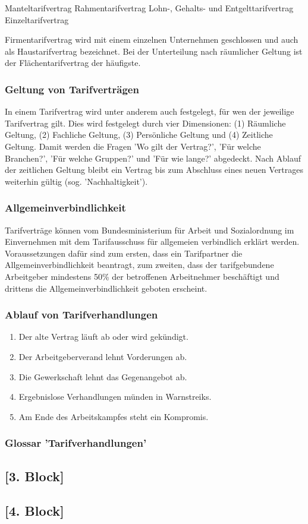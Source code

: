 Manteltarifvertrag
Rahmentarifvertrag
Lohn-, Gehalts- und Entgelttarifvertrag
Einzeltarifvertrag

Firmentarifvertrag wird mit einem einzelnen Unternehmen geschlossen und auch als Haustarifvertrag bezeichnet. Bei der Unterteilung nach räumlicher Geltung ist der Flächentarifvertrag der häufigste. 


\subsubsection{Geltung von Tarifverträgen}

In einem Tarifvertrag wird unter anderem auch festgelegt, für wen der jeweilige Tarifvertrag gilt. Dies wird festgelegt durch vier Dimensionen: (1) Räumliche Geltung, (2) Fachliche Geltung, (3) Persönliche Geltung und (4) Zeitliche Geltung. Damit werden die Fragen 'Wo gilt der Vertrag?', 'Für welche Branchen?', 'Für welche Gruppen?' und 'Für wie lange?' abgedeckt. Nach Ablauf der zeitlichen Geltung bleibt ein Vertrag bis zum Abschluss eines neuen Vertrages weiterhin gültig (sog. 'Nachhaltigkeit').

\subsubsection{Allgemeinverbindlichkeit}

Tarifverträge können vom Bundesministerium für Arbeit und Sozialordnung im Einvernehmen mit dem Tarifausschuss für allgemeien verbindlich erklärt werden. Voraussetzungen dafür sind zum ersten, dass ein Tarifpartner die Allgemeinverbindlichkeit beantragt, zum zweiten, dass der tarifgebundene Arbeitgeber mindestens 50\% der betroffenen Arbeitnehmer beschäftigt und drittens die Allgemeinverbindlichkeit geboten erscheint. 

\subsubsection{Ablauf von Tarifverhandlungen}

\begin{enumerate}
	\item Der alte Vertrag läuft ab oder wird gekündigt.
	\item Der Arbeitgeberverand lehnt Vorderungen ab.
	\item Die Gewerkschaft lehnt das Gegenangebot ab.
	\item Ergebnislose Verhandlungen münden in Warnstreiks.
	\item Am Ende des Arbeitskampfes steht ein Kompromis.
\end{enumerate}

\subsubsection{Glossar 'Tarifverhandlungen'}

\subsection{[3. Block]}
\subsection{[4. Block]}